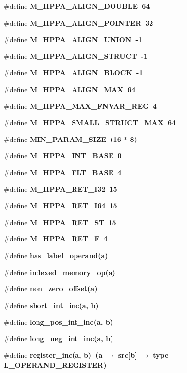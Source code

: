 \begin{CompactItemize}
\item 
\#define \bf{M\_\-HPPA\_\-ALIGN\_\-DOUBLE}~64
\item 
\#define \bf{M\_\-HPPA\_\-ALIGN\_\-POINTER}~32
\item 
\#define \bf{M\_\-HPPA\_\-ALIGN\_\-UNION}~-1
\item 
\#define \bf{M\_\-HPPA\_\-ALIGN\_\-STRUCT}~-1
\item 
\#define \bf{M\_\-HPPA\_\-ALIGN\_\-BLOCK}~-1
\item 
\#define \bf{M\_\-HPPA\_\-ALIGN\_\-MAX}~64
\item 
\#define \bf{M\_\-HPPA\_\-MAX\_\-FNVAR\_\-REG}~4
\item 
\#define \bf{M\_\-HPPA\_\-SMALL\_\-STRUCT\_\-MAX}~64
\item 
\#define \bf{MIN\_\-PARAM\_\-SIZE}~(16 $\ast$ 8)
\item 
\#define \bf{M\_\-HPPA\_\-INT\_\-BASE}~0
\item 
\#define \bf{M\_\-HPPA\_\-FLT\_\-BASE}~4
\item 
\#define \bf{M\_\-HPPA\_\-RET\_\-I32}~15
\item 
\#define \bf{M\_\-HPPA\_\-RET\_\-I64}~15
\item 
\#define \bf{M\_\-HPPA\_\-RET\_\-ST}~15
\item 
\#define \bf{M\_\-HPPA\_\-RET\_\-F}~4
\item 
\#define \bf{has\_\-label\_\-operand}(a)
\item 
\#define \bf{indexed\_\-memory\_\-op}(a)
\item 
\#define \bf{non\_\-zero\_\-offset}(a)
\item 
\#define \bf{short\_\-int\_\-inc}(a, b)
\item 
\#define \bf{long\_\-pos\_\-int\_\-inc}(a, b)
\item 
\#define \bf{long\_\-neg\_\-int\_\-inc}(a, b)
\item 
\#define \bf{register\_\-inc}(a, b)~(a $\rightarrow$ src[b] $\rightarrow$ type == L\_\-OPERAND\_\-REGISTER)
\end{CompactItemize}
